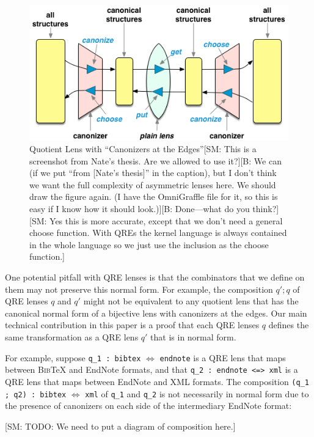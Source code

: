 \documentclass[acmsmall,review,anonymous]{acmart}\settopmatter{printfolios=true,printccs=false,printacmref=false}
\newcommand{\FINISH}[3]{\ifdraft\textcolor{#1}{[#2: #3]}\fi}
\newcommand{\bcp}[1]{\FINISH{dkred}{B}{#1}}
\newcommand{\sam}[1]{\FINISH{dkpurple}{SM}{#1}}
\newcommand{\bibtex}{\textsc{Bib}\TeX{}}
\newcommand{\cd}[1]{\lstinline[backgroundcolor=\color{white}]$#1$}
\begin{document}
\begin{figure}[t]
\centering
\includegraphics[width=\textwidth]{canonizers-outside}
\caption{Quotient Lens with ``Canonizers at the Edges''\sam{This is a
screenshot from Nate's thesis. Are we allowed to use it?}\bcp{We can
(if we put ``from [Nate's thesis]'' in the caption), but I don't think
we want the full complexity of asymmetric lenses here.  We should draw
the figure again.  (I have the OmniGraffle file for it, so this is
easy if I know how it should look.)}\bcp{Done---what do you think?}
\sam{Yes this is more accurate, except that we don't need a general choose
function. With QREs the kernel language is always contained in the whole
language so we just use the inclusion as the choose function.}}
\label{fig:attheedges}
\end{figure}

One potential pitfall with QRE lenses is that the combinators that we define on
them may not preserve this normal form. For example, the composition $q'; q$ of
QRE lenses $q$ and $q'$ might not be equivalent to any quotient lens that has
the canonical normal form of a bijective lens with canonizers at the edges.
Our main technical contribution in this paper is a proof that each QRE lenses
$q$ defines the same transformation as a QRE lens $q'$ that is in normal form.

For example, suppose \cd{q_1 : bibtex} $\Leftrightarrow$ \cd{endnote} is a QRE
lens that maps between \bibtex{} and EndNote formats, and that \cd{q_2 : endnote
<=> xml} is a QRE lens that maps between EndNote and XML formats. The
composition \cd{(q_1 ; q2) : bibtex} $\Leftrightarrow$ \cd{xml} of \cd{q_1} and
\cd{q_2} is not necessarily in normal form due to the presence of canonizers
on each side of the intermediary EndNote format:

\sam{TODO: We need to put a diagram of composition here.}
\end{document}
